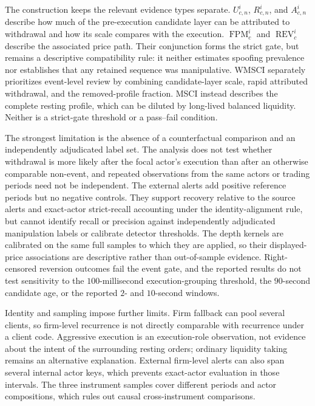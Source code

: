 \documentclass[11pt]{article}
\begin{document}
The construction keeps the relevant evidence types separate. $U^{i}_{c,n}$, $R^{i}_{c,n}$, and $A^{i}_{c,n}$ describe
how much of the pre-execution candidate layer can be attributed to withdrawal and how its scale compares with the execution.
$\operatorname{FPM}^{i}_{c}$ and $\operatorname{REV}^{i}_{c}$ describe the associated price path. Their conjunction forms
the strict gate, but remains a descriptive compatibility rule: it neither estimates spoofing prevalence nor establishes that
any retained sequence was manipulative. WMSCI separately prioritizes event-level review by combining candidate-layer scale,
rapid attributed withdrawal, and the removed-profile fraction. MSCI instead describes the complete resting profile, which can
be diluted by long-lived balanced liquidity. Neither is a strict-gate threshold or a pass--fail condition.

The strongest limitation is the absence of a counterfactual comparison and an independently adjudicated label set. The
analysis does not test whether withdrawal is more likely after the focal actor's execution than after an otherwise comparable
non-event, and repeated observations from the same actors or trading periods need not be independent. The external alerts add
positive reference periods but no negative controls. They support recovery relative to the source alerts and exact-actor
strict-recall accounting under the identity-alignment rule, but cannot identify recall or precision against independently
adjudicated manipulation labels or calibrate detector thresholds. The depth kernels are calibrated on the same full samples
to which they are applied, so their displayed-price associations are descriptive rather than out-of-sample evidence.
Right\nobreakdash-censored reversion outcomes fail the event gate, and the reported results do not test sensitivity to the
$100$-millisecond execution-grouping threshold, the $90$-second candidate age, or the reported $2$- and $10$-second windows.

Identity and sampling impose further limits. Firm fallback can pool several clients, so firm-level recurrence is not directly
comparable with recurrence under a client code. Aggressive execution is an execution-role observation, not evidence about the
intent of the surrounding resting orders; ordinary liquidity taking remains an alternative explanation. External firm-level
alerts can also span several internal actor keys, which prevents exact-actor evaluation in those intervals. The three
instrument samples cover different periods and actor compositions, which rules out causal cross-instrument comparisons.
\end{document}
